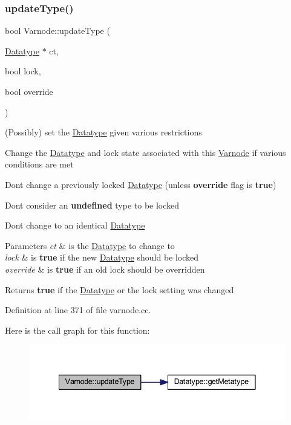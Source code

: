 \subsubsection{\texorpdfstring{updateType()}{updateType()}}
{\footnotesize\ttfamily bool Varnode\+::update\+Type (\begin{DoxyParamCaption}\item[{\mbox{\hyperlink{class_datatype}{Datatype}} $\ast$}]{ct,  }\item[{bool}]{lock,  }\item[{bool}]{override }\end{DoxyParamCaption})}



(Possibly) set the \mbox{\hyperlink{class_datatype}{Datatype}} given various restrictions 

Change the \mbox{\hyperlink{class_datatype}{Datatype}} and lock state associated with this \mbox{\hyperlink{class_varnode}{Varnode}} if various conditions are met
\begin{DoxyItemize}
\item Don\textquotesingle{}t change a previously locked \mbox{\hyperlink{class_datatype}{Datatype}} (unless {\bfseries{override}} flag is {\bfseries{true}})
\item Don\textquotesingle{}t consider an {\bfseries{undefined}} type to be locked
\item Don\textquotesingle{}t change to an identical \mbox{\hyperlink{class_datatype}{Datatype}} 
\begin{DoxyParams}{Parameters}
{\em ct} & is the \mbox{\hyperlink{class_datatype}{Datatype}} to change to \\
\hline
{\em lock} & is {\bfseries{true}} if the new \mbox{\hyperlink{class_datatype}{Datatype}} should be locked \\
\hline
{\em override} & is {\bfseries{true}} if an old lock should be overridden \\
\hline
\end{DoxyParams}
\begin{DoxyReturn}{Returns}
{\bfseries{true}} if the \mbox{\hyperlink{class_datatype}{Datatype}} or the lock setting was changed 
\end{DoxyReturn}

\end{DoxyItemize}

Definition at line 371 of file varnode.\+cc.

Here is the call graph for this function\+:
\nopagebreak
\begin{figure}[H]
\begin{center}
\leavevmode
\includegraphics[width=341pt]{class_varnode_a48932e5bf8aab53ae9b3a6a6d9b25ce8_cgraph}
\end{center}
\end{figure}


